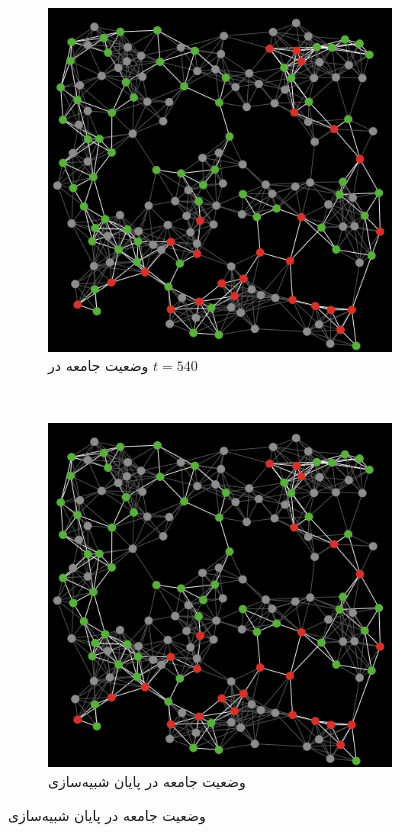 \begin{persian}
\begin{figure}[h]
\begin{subfigure}[b]{0.32\textwidth}
 \end{subfigure}
 ~ %
 \begin{subfigure}[b]{0.32\textwidth}
 \includegraphics[width=\textwidth]{figures/SIRS/t540}
 \caption{وضعیت جامعه در $t=540$}
 \end{subfigure}
 ~ %
 
 
 \begin{subfigure}[b]{0.4\textwidth}
 \includegraphics[width=\textwidth]{figures/SIRS/t540}
 \caption{وضعیت جامعه در پایان شبیه‌سازی}
 

\end{subfigure}
\end{figure}
\end{persian}
